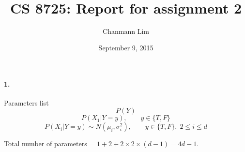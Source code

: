 \documentclass[a4paper]{article}
\begin{document}
\title{CS 8725: Report for assignment 2}
\author{Chanmann Lim}
\date{September 9, 2015}
\maketitle

\paragraph{1.} Parameters list \\
	$$ P(Y) $$
	$$ P(X_1|Y = y), \qquad y \in \{T, F\} $$
	$$ P(X_i|Y = y) \sim N(\mu_i, \sigma_i^2), \qquad y \in \{T, F\}, \; 2 \leq i \leq d $$

	Total number of parameters = $1 + 2 + 2 \times 2 \times (d-1) = 4d - 1 $.
\end{document}

